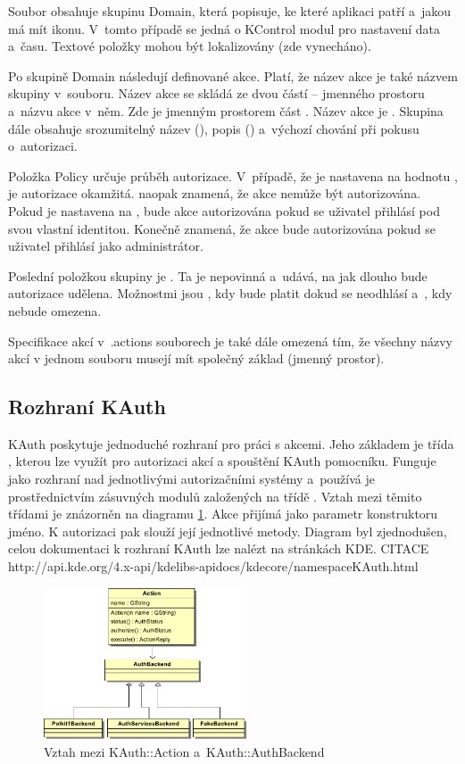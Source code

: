 Soubor obsahuje skupinu Domain, která popisuje, ke které aplikaci patří a~jakou má mít ikonu. V~tomto případě se jedná o KControl modul pro nastavení data a~času. Textové položky mohou být lokalizovány (zde vynecháno).

Po skupině Domain následují definované akce. Platí, že název akce je také názvem skupiny v~souboru. Název akce se skládá ze dvou částí -- jmenného prostoru a~názvu akce v~něm. Zde je jmenným prostorem část . Název akce je . Skupina dále obsahuje srozumitelný název (), popis () a~výchozí chování při pokusu o~autorizaci.

Položka Policy určuje průběh autorizace. V~případě, že je nastavena na hodnotu , je autorizace okamžitá.  naopak znamená, že akce nemůže být autorizována. Pokud je nastavena na , bude akce autorizována pokud se uživatel přihlásí pod svou vlastní identitou. Konečně  znamená, že akce bude autorizována pokud se uživatel přihlásí jako administrátor.

Poslední položkou skupiny je . Ta je nepovinná a~udává, na jak dlouho bude autorizace udělena. Možnostmi jsou , kdy bude platit dokud se neodhlásí a~, kdy nebude omezena.

Specifikace akcí v~.actions souborech je také dále omezená tím, že všechny názvy akcí v jednom souboru musejí mít společný základ (jmenný prostor).

\subsection*{Rozhraní KAuth}
KAuth poskytuje jednoduché rozhraní pro práci s akcemi. Jeho základem je třída , kterou lze využít pro autorizaci akcí a spouštění KAuth pomocníku. Funguje jako rozhraní nad jednotlivými autorizačními systémy a~používá je prostřednictvím zásuvných modulů založených na třídě . Vztah mezi těmito třídami je znázorněn na diagramu \ref{fig:KAuthDiag}. Akce přijímá jako parametr konstruktoru jméno. K autorizaci pak slouží její jednotlivé metody. Diagram byl zjednodušen, celou dokumentaci k rozhraní KAuth lze nalézt na stránkách KDE. CITACE http://api.kde.org/4.x-api/kdelibs-apidocs/kdecore/namespaceKAuth.html

\begin{figure}[h]
    \centering
    \includegraphics[width=6cm]{obrazky/KAuthAction.pdf}
    \caption{Vztah mezi KAuth::Action a~KAuth::AuthBackend}
    \label{fig:KAuthDiag}
\end{figure}

